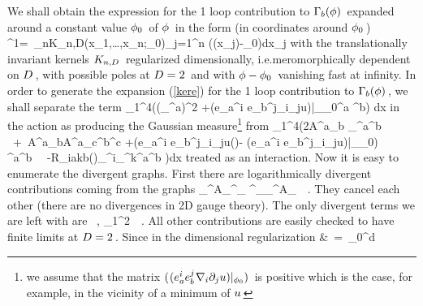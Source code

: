 We shall obtain the expression for the 1 loop contribution
to \s${{\Gamma}}_b(\phi)\hspace{0.05cm}$ expanded around a constant value
\s$\phi_0\hspace{0.05cm}$ of \s$\phi\hspace{0.05cm}$ in the form (in coordinates
around \s$\phi_0\hspace{0.05cm}$)
\qq
[\Ga_b(\phi)]^{1}\s=\
\sum\limits_n\int K_{n,D}(x_1,\dots,x_n;\phi_0)\s\prod\limits_{j=1}^n
(\phi(x_j)-\phi_0)\s\s dx_j
\label{kere}
\qqq
with the translationally invariant kernels \s$K_{n,D}\hspace{0.05cm}$
regularized dimensionally, i.\s e.\s\s meromorphically
dependent on \s$D\hspace{0.05cm}$, with possible poles at
\s$D=2\hspace{0.05cm}$ and with \s$\phi-\phi_0\hspace{0.05cm}$ vanishing fast
at infinity. In order to generate the expansion (\ref{kere})
for the 1 loop contribution to \s${{\Gamma}}_b(\phi)\hspace{0.05cm}$, we shall separate
the term
\qq
{_1\over^{4\pi}}\int\left((\da_\nu\xi^a)^2
\s+\s(e_a^i e_b^j\m\nabla_i\da_ju)|_{\phi_0}\s\xi^a\m
\xi^b\right)
\m dx
\non
\qqq
in the action as producing the Gaussian
measure\footnote{we assume that the matrix
\s$(\hspace{0.025cm}(e_a^i e_b^j\hspace{0.025cm}\nabla_i\partial_ju)|_{\phi_0})\hspace{0.05cm}$
is positive which is the case, for example, in the vicinity
of a minimum of \s$u\hspace{0.05cm}$} from
\qq
{_1\over^{4\pi}}\int\bigg(2\s A^{\s a}_{b\m\nu}
\s\da_\nu\xi^a\m\s\xi^b
\ +\ A^{\s a}_{b\m\nu}\s A^{\s a}_{c\m\nu}\s\m\xi^b\s\m\xi^c\s
+\left(e_a^i e_b^j\m\nabla_i\da_ju(\phi)\s-
\s(e_a^i e_b^j\m\nabla_i\da_ju)|_{\phi_0}\right)
\m\xi^a\m\xi^b\ \ \cr
-\s R_{iakb}(\phi)\s\s\da_\nu\phi^i\s\s\da_\nu\phi^k\s\s\xi^a\s\m\xi^b
\bigg)\m dx
\non
\qqq
treated as an interaction. Now it is easy to enumerate
the divergent graphs. First there are logarithmically
divergent contributions coming from the graphs
\qq
\smash{\mathop{{\Large{{\rm O}}}\hs{-0.232cm}{_{{\Large\bullet}}}}
\limits_{\atop A_\nu\s A_\nu}}\quad\quad\quad
\quad\quad\quad\quad\quad\quad\quad\quad\quad
_{^{A_\nu}}\s\s^{_\bullet}
\hs{-0.09cm}^{_\bullet}\s\s_{^{A_\la}}\ \ .
\non
\qqq
\vskip 0.2cm
\no They cancel each other (there are no divergences in
2D gauge theory). The only divergent terms we are left with are
\qq
\smash{\mathop{{\Large{{\rm O}}}\hs{-0.232cm}{_{{\Large\bullet}}}}
\limits_{\atop-\m R\s\m\da\phi\s\da\phi}}\ ,
\quad\quad
{}
\quad{}\quad\quad\quad
{_1\over^2}\s\s\ln\ \ .
\label{ppin}
\qqq
All other contributions are easily checked to
have finite limits at \s$D=2\hspace{0.05cm}$.
\s Since in the dimensional regularization
\qq
&\ =\ \int_0^\infty d\sigma
